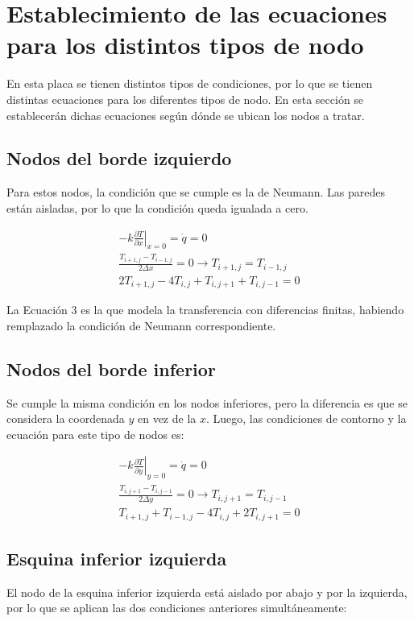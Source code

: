 \documentclass[12pt, notitlepage]{article}
\begin{document}
\section{Establecimiento de las ecuaciones para los distintos tipos de nodo}
En esta placa se tienen distintos tipos de condiciones, por lo que se tienen distintas ecuaciones para los diferentes tipos de nodo. En esta sección se establecerán dichas ecuaciones según dónde se ubican los nodos a tratar.

\subsection{Nodos del borde izquierdo}
Para estos nodos, la condición que se cumple es la de Neumann. Las paredes están aisladas, por lo que la condición queda igualada a cero.

\begin{gather*}
-k\left.\frac{\partial T}{\partial x}\right|_{x = 0} = \dot{q} = 0 \\
\frac{T_{i+1,j} - T_{i-1,j}}{2\Delta x} = 0 \rightarrow T_{i+1,j} = T_{i-1,j}\\
2T_{i+1,j} - 4T_{i,j} + T_{i,j+1} + T_{i,j-1} = 0
\end{gather*}

La Ecuación 3 es la que modela la transferencia con diferencias finitas, habiendo remplazado la condición de Neumann correspondiente.

\subsection{Nodos del borde inferior}
Se cumple la misma condición en los nodos inferiores, pero la diferencia es que se considera la coordenada $y$ en vez de la $x$. Luego, las condiciones de contorno y la ecuación para este tipo de nodos es:

\begin{gather*}
-k\left.\frac{\partial T}{\partial y}\right|_{y = 0} = \dot{q} = 0 \\
\frac{T_{i,j+1} - T_{i,j-1}}{2\Delta y} = 0 \rightarrow T_{i,j+1} = T_{i,j-1}\\
T_{i+1,j} + T_{i-1,j} - 4T_{i,j} + 2T_{i,j+1} = 0
\end{gather*}

\subsection{Esquina inferior izquierda}
El nodo de la esquina inferior izquierda está aislado por abajo y por la izquierda, por lo que se aplican las dos condiciones anteriores simultáneamente:
\end{document}
